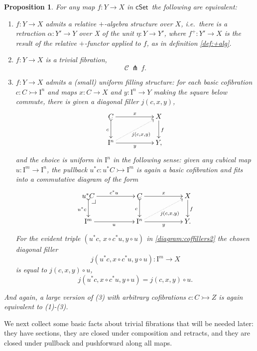 \documentclass[11pt]{amsart}
\makeatletter
\newcommand{\cSet}{\ensuremath{\mathsf{cSet}}}
\newcommand{\mono}{\ensuremath{\rightarrowtail}}
\newcommand{\ra}{\ensuremath{\rightarrow}}
\newcommand{\cof}{\ensuremath{\rightarrowtail}}
\newcommand{\I}{\ensuremath{\mathrm{I}}}
\newtheorem{proposition}[theorem]{Proposition}
\theoremstyle{remark}
\theoremstyle{definition}
\newcommand{\pbcorner}[1][dr]{\save*!/#1-1.2pc/#1:(-1,1)@^{|-}\restore}
\makeatother
\begin{document}
 \begin{proposition}\label{prop:uniformstructequivrelative} For any map $f : Y\ra X$ in \cSet\ the following are equivalent:
\begin{enumerate}
\item $f:Y\ra X$ admits a \emph{relative $+$-algebra structure over $X$}, i.e.\ there is a retraction  $\alpha :Y' \ra Y$ over X of the unit $\eta : Y\ra Y'$, where $f^+ : Y' \ra X$ is the result of the relative $+$-functor applied to $f$, as in definition \ref{def:+alg}.
\item $f:Y\ra  X$ is a \emph{trivial fibration},
\[
\mathcal{C}\, \pitchfork\,f.
\]
\item $f:Y\ra  X$ admits a (small) \emph{uniform filling structure}: 
for each basic cofibration $c : C \mono \I^{n}$ and maps $x : C\ra X$ and $y : \I^n\ra Y$ making the square below commute, there is given a diagonal filler $j(c,x,y)$,
\begin{equation}\label{diagram:coffillers}
\xymatrix{
C \ar@{>->}[d]_{c} \ar[rr]^{x} && X \ar[d]^{f} \\
\I^{n}\ar@{.>}[rru]_{j(c,x,y)} \ar[rr]_{y} && Y,
}
\end{equation}
and the choice is \emph{uniform in $\I^n$} in the following sense: given any cubical map $u : \I^m \ra \I^n$, the pullback $u^*c : u^*C\mono \I^m$ is again a basic cofibration and fits into a commutative diagram of the form
\begin{equation}\label{diagram:coffillers2}
\xymatrix{
u^*C \ar@{>->}[d]_{u^*c} \ar[rr]^{c^*u} \pbcorner &&  C \ar@{>->}[d]_{c} \ar[rr]^{x} && X\ar[d]^{f} \\
\I^{m} \ar[rr]_{u} && \I^{n} \ar@{.>}[rru]_{j(c,x,y)} \ar[rr]_{y} && Y.
}
\end{equation}
For the evident triple $(u^*c,\, x\circ c^*u, y\circ u)$ in \eqref{diagram:coffillers2} the chosen diagonal filler $$j(u^*c,x\circ c^*u,y\circ u): \I^m \ra X$$ is equal to  $j(c,x,y)\circ u$,
\begin{equation}\label{eq:uniformfillers}
j(u^*c, x\circ c^*u,y\circ u) = j(c,x,y)\circ u.
\end{equation}
\end{enumerate}
And again, a large version of (3) with arbitrary cofibrations $c : C\cof Z$ is again equivalent to (1)-(3).
\end{proposition}

We next collect some basic facts about trivial fibrations that will be needed later: they have sections, they are closed under composition and retracts, and they are closed under pullback and pushforward along all maps.
\end{document}
